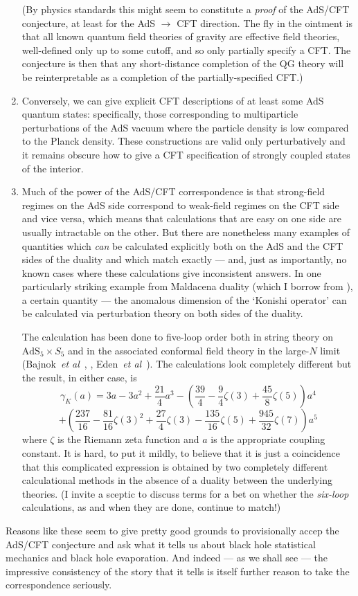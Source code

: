 \documentclass[12pt]{article}
\newcommand{\be}{\begin{equation}}
\newcommand{\ee}{\end{equation}}
\newcommand{\AdS}{\mathrm{AdS}}
\begin{document}
\begin{enumerate}
(By physics standards this might seem to constitute a \emph{proof} of the AdS/CFT conjecture, at least for the AdS $\rightarrow$ CFT direction. The fly in the ointment is that all known quantum field theories of gravity are effective field theories, well-defined only up to some cutoff, and so only partially specify a CFT. The conjecture is then that any short-distance completion of the QG theory will be reinterpretable as a completion of the partially-specified CFT.)
\item Conversely, we can give explicit CFT descriptions of at least some AdS quantum states: specifically, those corresponding to multiparticle perturbations of the AdS vacuum where the particle density is low compared to the Planck density. These constructions are valid only perturbatively and it remains obscure how to give a CFT specification of strongly coupled states of the interior.
\item Much of the power of the AdS/CFT correspondence is that strong-field regimes on the AdS side correspond to weak-field regimes on the CFT side and vice versa, which means that calculations that are easy on one side are usually intractable on the other. But there are nonetheless many examples of quantities which \emph{can} be calculated explicitly both on the AdS and the CFT sides of the duality and which match exactly --- and, just as importantly, no known cases where these calculations give inconsistent answers. In one particularly striking example from Maldacena duality (which I borrow from ), a certain quantity --- the anomalous dimension of the `Konishi operator' can be calculated via perturbation theory on both sides of the duality. 

The calculation has been done to five-loop order both in string theory on $\AdS_5 \times S_5$ and in the associated conformal field theory in the large-$N$ limit (Bajnok~\emph{et al}~, , Eden~\emph{et al}~). The calculations look completely different but the result, in either case, is
\[
\gamma_K(a) = 3a - 3a^2 +\frac{21}{4}a^3 - \left( \frac{39}{4} - \frac{9}{4}\zeta(3) + \frac{45}{8}\zeta(5)\right)a^4\]
\be
+  \left(\frac{237}{16}- \frac{81 }{16}\zeta(3)^2 + \frac{27}{4} \zeta(3) - \frac{135}{16}  \zeta(5)+ \frac{945}{32} \zeta(7)  \right)a^5
\ee
where $\zeta$ is the Riemann zeta function and $a$ is the appropriate coupling constant. It is hard, to put it mildly, to believe that it is just a coincidence that this complicated expression is obtained by two completely different calculational methods in the absence of a duality between the underlying theories. (I invite a sceptic to discuss terms for a bet on whether the \emph{six-loop} calculations, as and when they are done, continue to match!)
\end{enumerate}
Reasons like these seem to give pretty good grounds to provisionally accep the AdS/CFT conjecture and ask what it tells us about black hole statistical mechanics and black hole evaporation. And indeed --- as we shall see --- the impressive consistency of the story that it tells is itself further reason to take the correspondence seriously.
\end{document}
